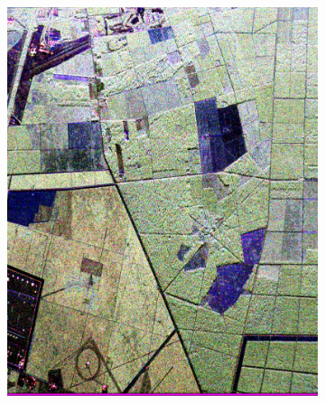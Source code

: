 \begin{figure}[tbp]
	\centering
	\begin{subfigure}[b]{0.4\textwidth}
			\includegraphics[width=\textwidth]{Figures/Extra/LandesKronC}
			\caption{}
			\label{fig:kronlandesc}
	\end{subfigure}
    ~
	\begin{subfigure}[b]{0.4\textwidth}

\end{subfigure}
\end{figure}
